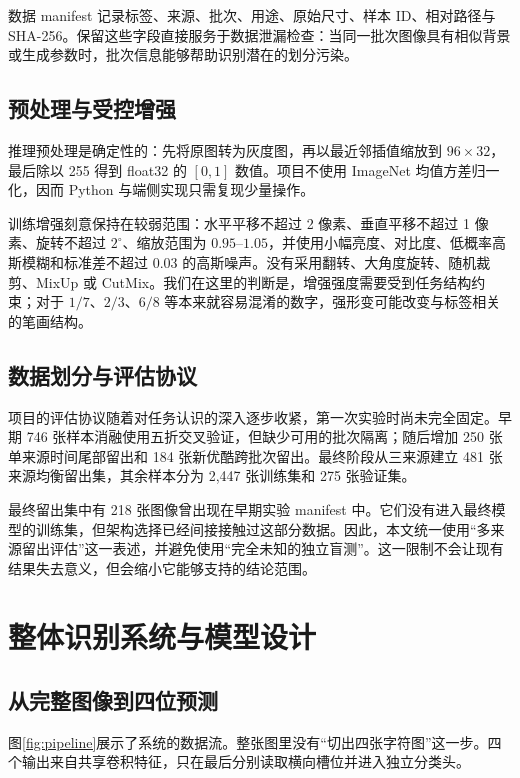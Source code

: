 \documentclass[UTF8,12pt,a4paper]{ctexart}
\begin{document}
数据 manifest 记录标签、来源、批次、用途、原始尺寸、样本 ID、相对路径与 SHA-256。保留这些字段直接服务于数据泄漏检查：当同一批次图像具有相似背景或生成参数时，批次信息能够帮助识别潜在的划分污染。

\subsection{预处理与受控增强}

推理预处理是确定性的：先将原图转为灰度图，再以最近邻插值缩放到 $96\times32$，最后除以 255 得到 float32 的 $[0,1]$ 数值。项目不使用 ImageNet 均值方差归一化，因而 Python 与端侧实现只需复现少量操作。

训练增强刻意保持在较弱范围：水平平移不超过 2 像素、垂直平移不超过 1 像素、旋转不超过 $2^\circ$、缩放范围为 $0.95$--$1.05$，并使用小幅亮度、对比度、低概率高斯模糊和标准差不超过 0.03 的高斯噪声。没有采用翻转、大角度旋转、随机裁剪、MixUp 或 CutMix。我们在这里的判断是，增强强度需要受到任务结构约束；对于 $1/7$、$2/3$、$6/8$ 等本来就容易混淆的数字，强形变可能改变与标签相关的笔画结构。

\subsection{数据划分与评估协议}

项目的评估协议随着对任务认识的深入逐步收紧，第一次实验时尚未完全固定。早期 746 张样本消融使用五折交叉验证，但缺少可用的批次隔离；随后增加 250 张单来源时间尾部留出和 184 张新优酷跨批次留出。最终阶段从三来源建立 481 张来源均衡留出集，其余样本分为 2,447 张训练集和 275 张验证集。

最终留出集中有 218 张图像曾出现在早期实验 manifest 中。它们没有进入最终模型的训练集，但架构选择已经间接接触过这部分数据。因此，本文统一使用“多来源留出评估”这一表述，并避免使用“完全未知的独立盲测”。这一限制不会让现有结果失去意义，但会缩小它能够支持的结论范围。

\section{整体识别系统与模型设计}

\subsection{从完整图像到四位预测}

图\ref{fig:pipeline}展示了系统的数据流。整张图里没有“切出四张字符图”这一步。四个输出来自共享卷积特征，只在最后分别读取横向槽位并进入独立分类头。
\end{document}
